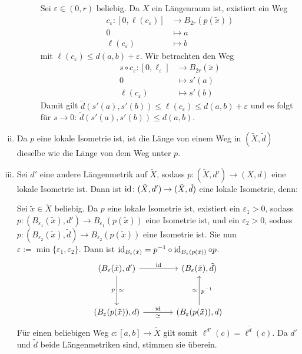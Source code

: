\begin{beweis}
\begin{enumerate}[(i)]
\begin{description}
			Sei $\varepsilon \in (0,r)$ beliebig.
			Da $X$ ein Längenraum ist, existiert ein Weg
			\begin{align*}
				c_\varepsilon\colon [0,\ell(c_\varepsilon)] &\longrightarrow B_{2r}(p(\tilde{x})) \\
				0 &\longmapsto a \\
				\ell(c_\varepsilon) &\longmapsto b
			\end{align*}
			mit $\ell(c_\varepsilon) \leq d(a,b) + \varepsilon$.
			\newpage
			Wir betrachten den Weg
			\begin{align*}
				s \circ c_\varepsilon\colon [0,\ell_\varepsilon] &\longrightarrow B_{2r}(\tilde{x}) \\
				0 &\longmapsto s'(a) \\
				\ell(c_\varepsilon) &\longmapsto s'(b)
			\end{align*}
			Damit gilt $\tilde{d}(s'(a),s'(b)) \leq \ell(c_\varepsilon) \leq d(a,b) + \varepsilon$ und es folgt für $s \rightarrow 0$: $\tilde{d}(s'(a),s'(b)) \leq d(a,b)$.
		\end{description}
		\item Da $p$ eine lokale Isometrie ist, ist die Länge von einem Weg in $(\tilde{X},\tilde{d})$ dieselbe wie die Länge von dem Weg unter $p$.
		\item Sei $d'$ eine andere Längenmetrik auf $\tilde{X}$, sodass $p \colon (\tilde{X},d') \rightarrow (X,d)$ eine lokale Isometrie ist.
		Dann ist $\operatorname{id}\colon (\tilde{X},d') \rightarrow (\tilde{X},\tilde{d})$ eine lokale Isometrie, denn:
		
		Sei $\tilde{x} \in \tilde{X}$ beliebig.
		Da $p$ eine lokale Isometrie ist, existiert ein $\varepsilon_1 > 0$, sodass $p \colon (B_{\varepsilon_1}(\tilde{x}),d') \rightarrow B_{\varepsilon_1}(p(\tilde{x}))$ eine Isometrie ist, und ein $\varepsilon_2 > 0$, sodass $p \colon (B_{\varepsilon_2}(\tilde{x}),\tilde{d}) \rightarrow B_{\varepsilon_2}(p(\tilde{x}))$ eine Isometrie ist.
		Sie nun $\varepsilon := \min\{\varepsilon_1,\varepsilon_2\}$.
		Dann ist $\operatorname{id}_{B_\varepsilon(\tilde{x})} = p^{-1} \circ \operatorname{id}_{B_\varepsilon(p(\tilde{x}))} \circ p$.
		\[
		\begin{tikzcd}[column sep=large, row sep=huge]
			(B_\varepsilon(\tilde{x}),d') \arrow{r}{\id} \arrow[d,"\simeq","p"'] & (B_\varepsilon(\tilde{x}),\tilde{d}) \\
			(B_\varepsilon(p(\tilde{x})),d) \arrow[r,"\id","\simeq"'] & (B_\varepsilon(p(\tilde{x})),d) \arrow[u,"\simeq","p^{-1}"']
		\end{tikzcd}
		\]
		Für einen beliebigen Weg $c \colon [a,b] \rightarrow \tilde{X}$ gilt somit $\ell^{d'}(c) = \ell^{\tilde{d}}(c)$.
		Da $d'$ und $\tilde{d}$ beide Längenmetriken sind, stimmen sie überein. \qedhere
	\end{enumerate}
\end{beweis}

